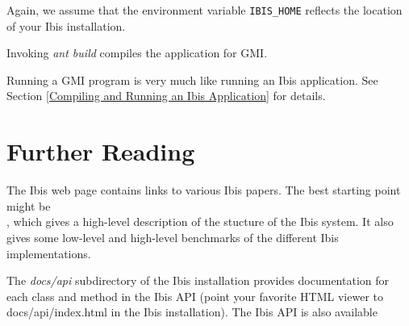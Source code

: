 \documentclass[10pt]{article}
\newcommand{\mysection}[1]{\section{#1}\label{#1}}
\begin{document}
Again, we assume that the environment variable \texttt{IBIS\_HOME} reflects
the location of your Ibis installation.

Invoking \emph{ant build} compiles the application for GMI.

Running a GMI program is very much like running an Ibis application.
See Section \ref{Compiling and Running an Ibis Application} for details.


\mysection{Further Reading}

The Ibis web page
{}
{}
contains links to various Ibis papers.
The best starting point might be \\
{}
{}, which gives a high-level description of the stucture of the Ibis system.
It also gives some low-level and high-level benchmarks of the different Ibis implementations.

The \emph{docs/api} subdirectory of the Ibis installation provides
documentation for each class and method in the Ibis API (point your favorite
HTML viewer to docs/api/index.html in the Ibis installation).
The Ibis API is also available
\end{document}
